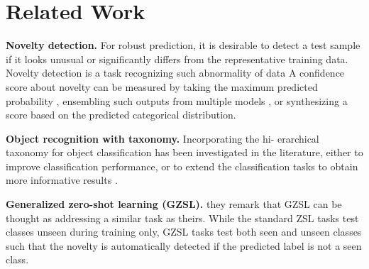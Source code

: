 \documentclass[10pt,twocolumn,letterpaper]{article}
\begin{document}
\section{Related Work}
\noindent \textbf{Novelty detection.} For robust prediction, it is desirable to
detect a test sample if it looks unusual or significantly differs from the representative training data. Novelty detection
is a task recognizing such abnormality of data A
confidence score about novelty can be measured by taking
the maximum predicted probability , ensembling such
outputs from multiple models , or synthesizing a score
based on the predicted categorical distribution.
\par
\noindent \textbf{Object recognition with taxonomy.} Incorporating the hi-
erarchical taxonomy for object classification has been investigated in the literature, either to improve classification
performance, or to extend the classification tasks to
obtain more informative results \cite{deng2012hedging}.
\par
\noindent \textbf{Generalized zero-shot learning (GZSL).} they remark that
GZSL \cite{chao2016empirical} can be thought as addressing a similar task
as theirs. While the standard ZSL tasks test classes unseen
during training only, GZSL tasks test both seen and unseen
classes such that the novelty is automatically detected if the
predicted label is not a seen class.


\end{document}
